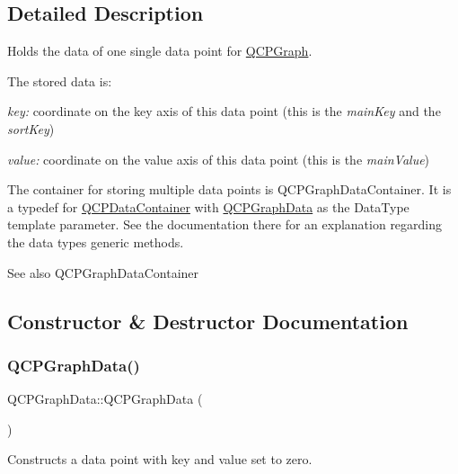 \subsection{Detailed Description}
Holds the data of one single data point for \hyperlink{class_q_c_p_graph}{Q\+C\+P\+Graph}. 

The stored data is\+: \begin{DoxyItemize}
\item {\itshape key\+:} coordinate on the key axis of this data point (this is the {\itshape main\+Key} and the {\itshape sort\+Key}) \item {\itshape value\+:} coordinate on the value axis of this data point (this is the {\itshape main\+Value})\end{DoxyItemize}
The container for storing multiple data points is Q\+C\+P\+Graph\+Data\+Container. It is a typedef for \hyperlink{class_q_c_p_data_container}{Q\+C\+P\+Data\+Container} with \hyperlink{class_q_c_p_graph_data}{Q\+C\+P\+Graph\+Data} as the Data\+Type template parameter. See the documentation there for an explanation regarding the data type\textquotesingle{}s generic methods.

\begin{DoxySeeAlso}{See also}
Q\+C\+P\+Graph\+Data\+Container 
\end{DoxySeeAlso}


\subsection{Constructor \& Destructor Documentation}
\mbox{\label{class_q_c_p_graph_data_ac43f7499383d2fa2ffb7a4ad43f76c7c}} 
\subsubsection{\texorpdfstring{Q\+C\+P\+Graph\+Data()}{QCPGraphData()}\hspace{0.1cm}{\footnotesize\ttfamily [1/2]}}
{\footnotesize\ttfamily Q\+C\+P\+Graph\+Data\+::\+Q\+C\+P\+Graph\+Data (\begin{DoxyParamCaption}{ }\end{DoxyParamCaption})}

Constructs a data point with key and value set to zero. \mbox{\label{class_q_c_p_graph_data_a2c32177f12f902f4e05f712837082bd6}} 
